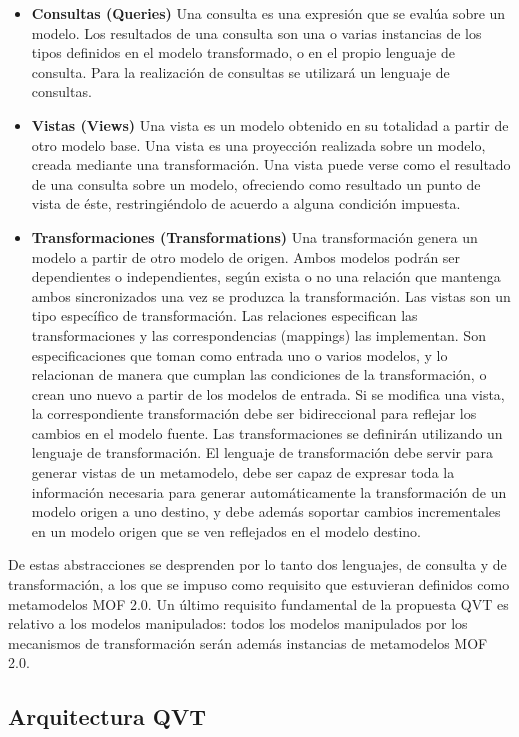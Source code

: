{\begin{itemize}
	\item \textbf{Consultas (Queries)} Una consulta es una expresión que se evalúa sobre un modelo. Los resultados de una consulta son una o varias instancias de los tipos definidos en el modelo transformado, o en el propio lenguaje de consulta. Para la realización de consultas se utilizará un lenguaje de consultas.	 	 	 	
	\item \textbf{Vistas (Views)} Una vista es un modelo obtenido en su totalidad a partir de otro modelo base. Una vista es una proyección realizada sobre un modelo, creada mediante una transformación. Una vista puede verse como el resultado de una consulta sobre un modelo, ofreciendo como resultado un punto de vista de éste, restringiéndolo de acuerdo a alguna condición impuesta.	
	\item \textbf{Transformaciones (Transformations)} Una transformación genera un modelo a partir de otro modelo de origen. Ambos modelos podrán ser dependientes o independientes, según exista o no una relación que mantenga ambos sincronizados una vez se produzca la transformación. Las vistas son un tipo específico de transformación. Las relaciones especifican las transformaciones y las correspondencias (mappings) las implementan. Son especificaciones que toman como entrada uno o varios modelos, y lo relacionan de manera que cumplan las condiciones de la transformación, o crean uno nuevo a partir de los modelos de entrada. Si se modifica una vista, la correspondiente transformación debe ser bidireccional para reflejar los cambios en el modelo fuente. Las transformaciones se definirán utilizando un lenguaje de transformación. El lenguaje de transformación debe servir para generar vistas de un metamodelo, debe ser capaz de expresar toda la información necesaria para generar automáticamente la transformación de un modelo origen a uno destino, y debe además soportar cambios incrementales en un modelo origen que se ven reflejados en el modelo destino.
\end{itemize}

De estas abstracciones se desprenden por lo tanto dos lenguajes, de consulta y de transformación, a los que se impuso como requisito que estuvieran definidos como metamodelos MOF 2.0. Un último requisito fundamental de la propuesta QVT es relativo a los modelos manipulados: todos los modelos manipulados por los mecanismos de transformación serán además instancias de metamodelos MOF 2.0.

\subsection{Arquitectura QVT}
\label{Arquitectura QVT}

}
